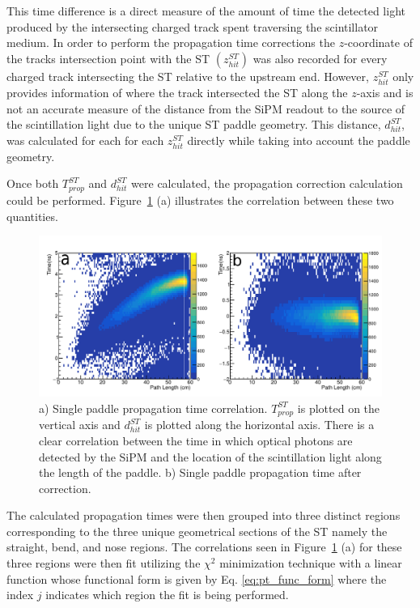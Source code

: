 This time difference is a direct measure of the amount of time the detected light produced by the intersecting charged track spent traversing the scintillator medium.  In order to perform the propagation time corrections the $z$-coordinate of the tracks intersection point with the ST $(z^{ST}_{hit})$ was also recorded for every charged track intersecting the ST relative to the upstream end.  However, $z^{ST}_{hit}$ only provides information of where the track intersected the ST along the $z$-axis and is not an accurate measure of the distance from the SiPM readout to the source of the scintillation light due to the unique ST paddle geometry.  This distance, $d^{ST}_{hit}$, was calculated for each for each $z^{ST}_{hit}$ directly while taking into account the paddle geometry. 

Once both $T^{ST}_{prop}$ and $d^{ST}_{hit}$ were calculated, the propagation correction calculation could be performed.  Figure~\ref{fig:proptimeuncorr} (a) illustrates the correlation between these two quantities.
	\begin{figure}[!htb]
		\centering
		\includegraphics[width=1.0\textwidth]{calibration/figs/drawing}
		\caption{a) Single paddle propagation time correlation.  $T^{ST}_{prop}$ is plotted on the vertical axis and $d^{ST}_{hit}$ is plotted along the horizontal axis. There is a clear correlation between the time in which optical photons are detected by the SiPM and the location of the scintillation light along the length of the paddle. b) Single paddle propagation time after correction.}
		\label{fig:proptimeuncorr}
	\end{figure}
The calculated propagation times were then grouped into three distinct regions corresponding to the three unique geometrical sections of the ST namely the straight, bend, and nose regions.  The correlations seen in Figure~\ref{fig:proptimeuncorr} (a) for these three regions were then fit utilizing the $\chi^{2}$ minimization technique with a linear function whose functional form is given by Eq. \ref{eq:pt_func_form} where the index $j$ indicates which region the fit is being performed.
